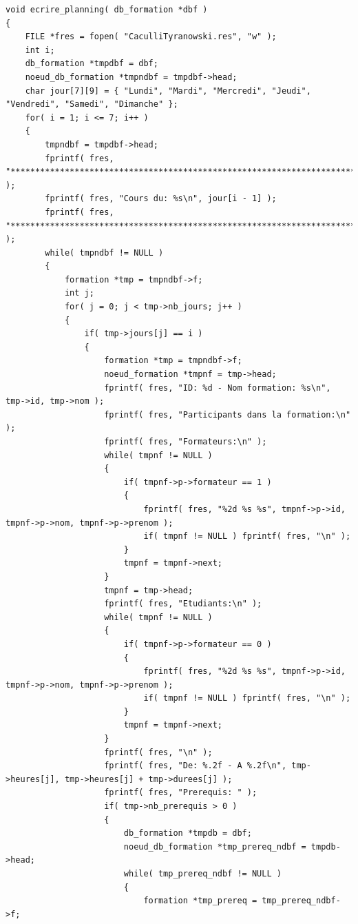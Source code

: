 \documentclass[11pt]{article}
\begin{document}
\begin{lstlisting}
void ecrire_planning( db_formation *dbf )
{
    FILE *fres = fopen( "CaculliTyranowski.res", "w" );
    int i;
    db_formation *tmpdbf = dbf;
    noeud_db_formation *tmpndbf = tmpdbf->head;
    char jour[7][9] = { "Lundi", "Mardi", "Mercredi", "Jeudi", "Vendredi", "Samedi", "Dimanche" };
    for( i = 1; i <= 7; i++ )
    {
        tmpndbf = tmpdbf->head;
        fprintf( fres, "********************************************************************************\n" );
        fprintf( fres, "Cours du: %s\n", jour[i - 1] );
        fprintf( fres, "********************************************************************************\n" );
        while( tmpndbf != NULL )
        {
            formation *tmp = tmpndbf->f;
            int j;
            for( j = 0; j < tmp->nb_jours; j++ )
            {
                if( tmp->jours[j] == i )
                {
                    formation *tmp = tmpndbf->f;
                    noeud_formation *tmpnf = tmp->head;
                    fprintf( fres, "ID: %d - Nom formation: %s\n", tmp->id, tmp->nom );
                    fprintf( fres, "Participants dans la formation:\n" );
                    fprintf( fres, "Formateurs:\n" );
                    while( tmpnf != NULL )
                    {
                        if( tmpnf->p->formateur == 1 )
                        {
                            fprintf( fres, "%2d %s %s", tmpnf->p->id, tmpnf->p->nom, tmpnf->p->prenom );
                            if( tmpnf != NULL ) fprintf( fres, "\n" );
                        }
                        tmpnf = tmpnf->next;
                    }
                    tmpnf = tmp->head;
                    fprintf( fres, "Etudiants:\n" );
                    while( tmpnf != NULL )
                    {
                        if( tmpnf->p->formateur == 0 )
                        {
                            fprintf( fres, "%2d %s %s", tmpnf->p->id, tmpnf->p->nom, tmpnf->p->prenom );
                            if( tmpnf != NULL ) fprintf( fres, "\n" );
                        }
                        tmpnf = tmpnf->next;
                    }
                    fprintf( fres, "\n" );
                    fprintf( fres, "De: %.2f - A %.2f\n", tmp->heures[j], tmp->heures[j] + tmp->durees[j] );
                    fprintf( fres, "Prerequis: " );
                    if( tmp->nb_prerequis > 0 )
                    {
                        db_formation *tmpdb = dbf;
                        noeud_db_formation *tmp_prereq_ndbf = tmpdb->head;
                        while( tmp_prereq_ndbf != NULL )
                        {
                            formation *tmp_prereq = tmp_prereq_ndbf->f;

\end{lstlisting}
\end{document}
